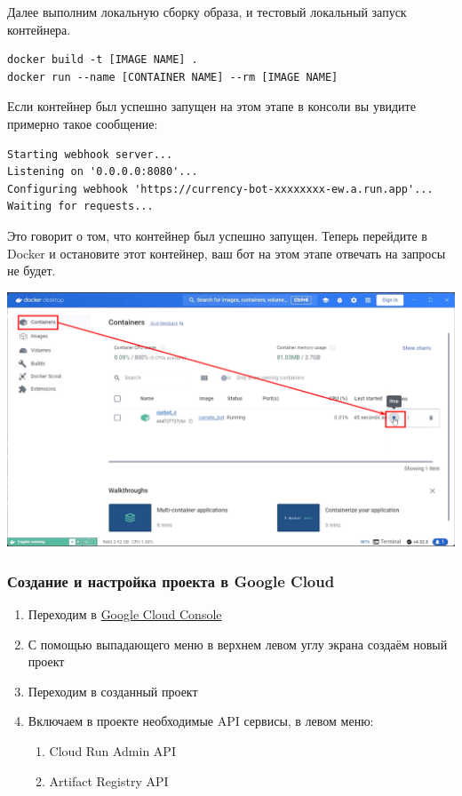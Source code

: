 \documentclass[
]{book}
\providecommand{\tightlist}{%
  \setlength{\itemsep}{0pt}\setlength{\parskip}{0pt}}
\begin{document}
Далее выполним локальную сборку образа, и тестовый локальный запуск контейнера.

\begin{verbatim}
docker build -t [IMAGE NAME] .
docker run --name [CONTAINER NAME] --rm [IMAGE NAME]
\end{verbatim}

Если контейнер был успешно запущен на этом этапе в консоли вы увидите примерно такое сообщение:

\begin{verbatim}
Starting webhook server...
Listening on '0.0.0.0:8080'...
Configuring webhook 'https://currency-bot-xxxxxxxx-ew.a.run.app'...
Waiting for requests...
\end{verbatim}

Это говорит о том, что контейнер был успешно запущен. Теперь перейдите в Docker и остановите этот контейнер, ваш бот на этом этапе отвечать на запросы не будет.

\includegraphics{img/9-8.png}

\subsubsection{Создание и настройка проекта в Google Cloud}\label{ux441ux43eux437ux434ux430ux43dux438ux435-ux438-ux43dux430ux441ux442ux440ux43eux439ux43aux430-ux43fux440ux43eux435ux43aux442ux430-ux432-google-cloud}

\begin{enumerate}
\def\labelenumi{\arabic{enumi}.}
\tightlist
\item
  Переходим в \href{https://console.cloud.google.com/welcome}{Google Cloud Console}
\item
  С помощью выпадающего меню в верхнем левом углу экрана создаём новый проект
\item
  Переходим в созданный проект
\item
  Включаем в проекте необходимые API сервисы, в левом меню:

  \begin{enumerate}
  \def\labelenumii{\arabic{enumii}.}
  \tightlist
  \item
    Cloud Run Admin API
  \item
    Artifact Registry API
  \end{enumerate}
\end{enumerate}
\end{document}

